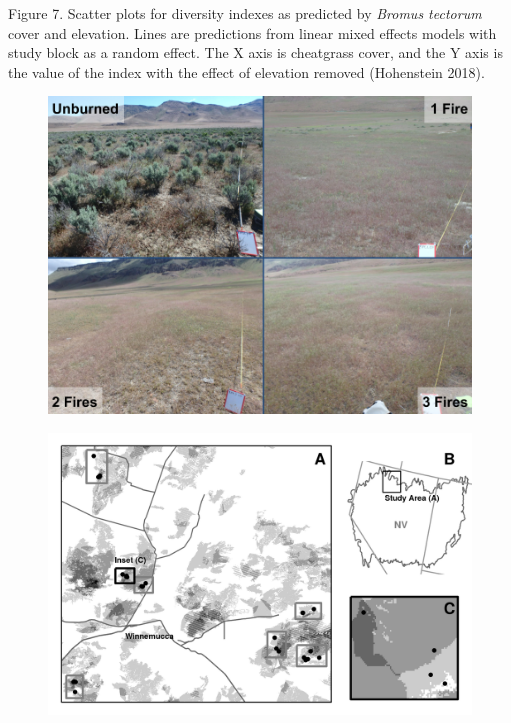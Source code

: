 \documentclass[]{article}
\begin{document}
Figure 7. Scatter plots for diversity indexes as predicted by
\emph{Bromus tectorum} cover and elevation. Lines are predictions from
linear mixed effects models with study block as a random effect. The X
axis is cheatgrass cover, and the Y axis is the value of the index with
the effect of elevation removed (Hohenstein 2018).

\newpage

\begin{figure}
 
  \begin{center}
    \includegraphics{figures/fire_pics.png}
    \caption{}
  \end{center}
\end{figure}

\clearpage

\newpage

\begin{figure}
 
  \begin{center}
    \includegraphics{figures/map.png}
    \caption{}
  \end{center}
\end{figure}
\end{document}
